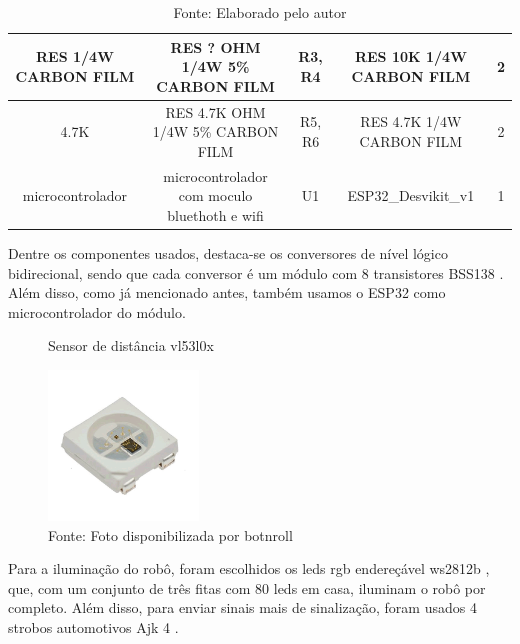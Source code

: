 \documentclass[../poliXuniversity_hospital_-USP-report.tex]{subfiles}
\begin{document}
\begin{table}[!h]
\begin{adjustbox}{width=\columnwidth,center}
\begin{tabular}{|c|c|c|c|c|}
RES 1/4W   CARBON FILM      & RES ? OHM 1/4W 5\%   CARBON FILM                               & R3, R4                   & RES 10K 1/4W CARBON   FILM  & 2        \\ \hline
4.7K                        & RES 4.7K OHM 1/4W 5\%   CARBON FILM                            & R5, R6                   & RES 4.7K 1/4W CARBON   FILM & 2        \\ \hline
microcontrolador            & microcontrolador com   moculo bluethoth e wifi                 & U1                       & ESP32\_Desvikit\_v1         & 1        \\ \hline

\end{tabular}
\end{adjustbox}
\centering
\caption*{Fonte: Elaborado pelo autor}
\label{table:Componentes Utilizados na placa de Sinalização - Protótipo}
\end{table}

Dentre os componentes usados, destaca-se os conversores de nível lógico bidirecional, sendo que cada conversor é um módulo com 8 transistores BSS138 \cite{BSS138_datasheet} . Além disso, como já mencionado antes, também usamos o ESP32 \cite{esp32} como microcontrolador do módulo.

\begin{figure}
\centering
\caption{ Sensor de distância vl53l0x}\label{wrap-fig:1}
\includegraphics[width=4cm]{modulos/led_rgb_end.png}
\caption*{Fonte: Foto disponibilizada por botnroll}\label{wrap-fig:1}
\end{figure} 

Para a iluminação do robô, foram escolhidos os leds rgb endereçável ws2812b \cite{WS2812B_datasheet}, que, com um conjunto de três fitas com 80 leds em casa, iluminam o robô por completo. Além disso, para enviar sinais mais de sinalização, foram usados 4 strobos automotivos Ajk 4 \cite{strobos_datasheet}.
\end{document}
